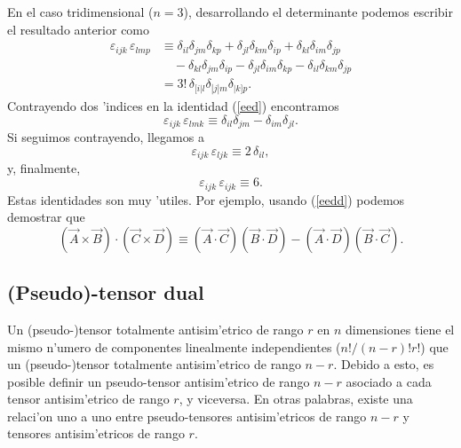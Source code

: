 En el caso tridimensional ($n=3$), desarrollando el determinante podemos escribir el resultado anterior como
\begin{align}
\varepsilon_{ijk}\,\varepsilon_{lmp} & \equiv \delta_{il}\delta_{jm}\delta_{kp} +\delta_{jl}\delta_{km}\delta_{ip} +\delta_{kl}\delta_{im}\delta_{jp} \nonumber\\
& \quad -\delta_{kl}\delta_{jm}\delta_{ip} -\delta_{jl}\delta_{im}\delta_{kp} -\delta_{il}\delta_{km}\delta_{jp} \label{eed}\\
& = 3!\, \delta_{[i|l}\delta_{|j|m}\delta_{|k]p}.
\end{align}
Contrayendo dos 'indices en la identidad (\ref{eed}) encontramos
\begin{equation}
\boxed{\varepsilon_{ijk}\,\varepsilon_{lmk}\equiv \delta_{il}\delta_{jm} -\delta_{im}\delta_{jl}.} \label{eedd}
\end{equation}
Si seguimos contrayendo, llegamos a
\begin{equation}
\varepsilon_{ijk}\,\varepsilon_{ljk}\equiv 2\,\delta_{il},
\end{equation}
y, finalmente,
\begin{equation}
\varepsilon_{ijk}\,\varepsilon_{ijk}\equiv 6.
\end{equation}
Estas identidades son muy 'utiles. Por ejemplo, usando (\ref{eedd}) podemos demostrar que
\begin{equation}
(\vec{A}\times\vec{B})\cdot(\vec{C}\times\vec{D})\equiv (\vec{A}\cdot\vec{C})(\vec{B}\cdot\vec{D})-(\vec{A}\cdot\vec{D})(\vec{B}\cdot\vec{C}).
\end{equation}

\subsection{(Pseudo)-tensor dual}

Un (pseudo-)tensor totalmente antisim'etrico de rango $r$ en $n$ dimensiones tiene el mismo n'umero de componentes linealmente independientes ($n!/(n-r)!r!$) que un (pseudo-)tensor totalmente antisim'etrico de rango $n-r$. Debido a esto, es posible definir un pseudo-tensor antisim'etrico de rango $n-r$ asociado a cada tensor antisim'etrico de rango $r$, y viceversa. En otras palabras, existe una relaci'on uno a uno entre pseudo-tensores antisim'etricos de rango $n-r$ y tensores antisim'etricos de rango $r$.


